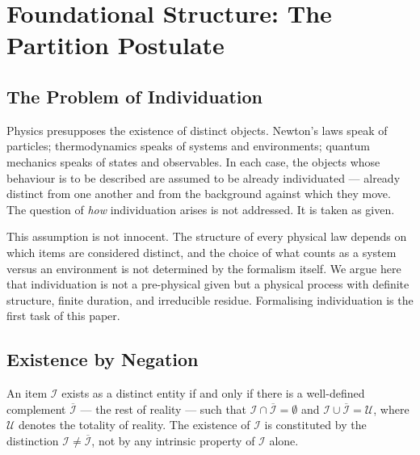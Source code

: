 
\section{Foundational Structure: The Partition Postulate}
\label{sec:axioms}

\subsection{The Problem of Individuation}
\label{subsec:individuation}

Physics presupposes the existence of distinct objects. Newton's laws speak of
particles; thermodynamics speaks of systems and environments; quantum mechanics
speaks of states and observables. In each case, the objects whose behaviour is
to be described are assumed to be already individuated --- already distinct from
one another and from the background against which they move. The question of
\emph{how} individuation arises is not addressed. It is taken as given.

This assumption is not innocent. The structure of every physical law depends on
which items are considered distinct, and the choice of what counts as a system
versus an environment is not determined by the formalism itself. We argue here
that individuation is not a pre-physical given but a physical process with
definite structure, finite duration, and irreducible residue. Formalising
individuation is the first task of this paper.

\subsection{Existence by Negation}
\label{subsec:negation}

\begin{postulate}
\label{post:negation}
An item $\mathcal{I}$ exists as a distinct entity if and only if there is a
well-defined complement $\overline{\mathcal{I}}$ --- the rest of reality --- such
that $\mathcal{I} \cap \overline{\mathcal{I}} = \emptyset$ and
$\mathcal{I} \cup \overline{\mathcal{I}} = \mathcal{U}$, where $\mathcal{U}$
denotes the totality of reality. The existence of $\mathcal{I}$ is constituted
by the distinction $\mathcal{I} \neq \overline{\mathcal{I}}$, not by any
intrinsic property of $\mathcal{I}$ alone.
\end{postulate}

